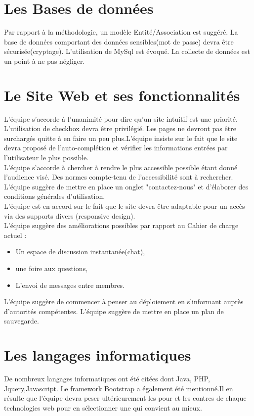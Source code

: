 \documentclass [a4paper] {article}
\begin{document}
\section{Les Bases de données}
Par rapport à la méthodologie, un modèle Entité/Association est suggéré.
La base de données comportant des données sensibles(mot de passe) devra être sécurisée(cryptage). L'utilisation de MySql est évoqué. La collecte de données est un point à ne pas négliger.


\section{Le Site Web et ses fonctionnalités}

L'équipe s'accorde à l'unanimité pour dire qu'un site intuitif est une priorité. L'utilisation de checkbox devra être privilégié. Les pages ne devront pas être surchargés quitte à en faire un peu plus.L'équipe insiste sur le fait que le site devra proposé de l'auto-complétion  et vérifier les informations entrées par l'utilisateur le plus possible.\\
L'équipe s'accorde à chercher à rendre le plus accessible possible étant donné l'audience visé. Des normes compte-tenu de l'accessibilité sont à rechercher. L'équipe suggère de mettre en place un onglet "contactez-nous" et d'élaborer des conditions générales d'utilisation.\\
L'équipe est en accord sur le fait que le site devra être adaptable pour un accès via des supports divers (responsive design).
\\

L'équipe suggère des améliorations possibles par rapport au Cahier de charge actuel : 
\begin{itemize}
\item Un espace de discussion instantanée(chat),
\item une foire aux questions,
\item L'envoi de messages entre membres.
\end{itemize}

L'équipe suggère de commencer à penser au déploiement en s'informant auprès d’autorités compétentes.
L'équipe suggère de mettre en place un plan de sauvegarde. 


\section{Les langages informatiques}
De nombreux langages informatiques ont été citées dont Java, PHP, Jquery,Javascript.
Le framework Bootstrap a également été mentionné.Il en résulte que l'équipe devra peser ultérieurement les pour et les contres de chaque technologies web pour en sélectionner une qui convient au mieux.
\\
\end{document}
